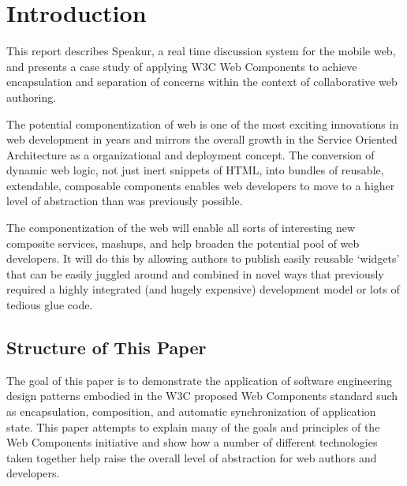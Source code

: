 \chapter{Introduction}
%

%
%

This report describes Speakur, a real time discussion system for the mobile web, and 
presents a case study of applying W3C Web Components 
to achieve encapsulation and separation of concerns within the context of 
collaborative web authoring. 

The potential componentization of web is one of the most exciting innovations in web development in years and mirrors the overall growth in the Service Oriented Architecture 
as a organizational and deployment concept. 
The conversion of dynamic web logic, not just inert snippets of HTML, into bundles of reusable, extendable, composable components enables web developers to move to a higher level of abstraction than was previously possible.

The componentization of the web will enable all sorts of interesting new composite services, mashups, and help broaden the potential pool of web developers. 
It will do this by allowing authors to publish easily reusable `widgets' that can be easily juggled around and combined in novel ways that previously required a highly integrated (and hugely expensive) development model or lots of tedious glue code.

\section{Structure of This Paper}
%

The goal of this paper is to demonstrate the application of software engineering design patterns embodied in the  W3C proposed Web Components standard such as encapsulation, composition, and
automatic synchronization of application state. 
This paper attempts to explain many of the goals and principles of the Web Components initiative and show how a number of different technologies taken together help raise the overall level of abstraction for web authors and developers.

